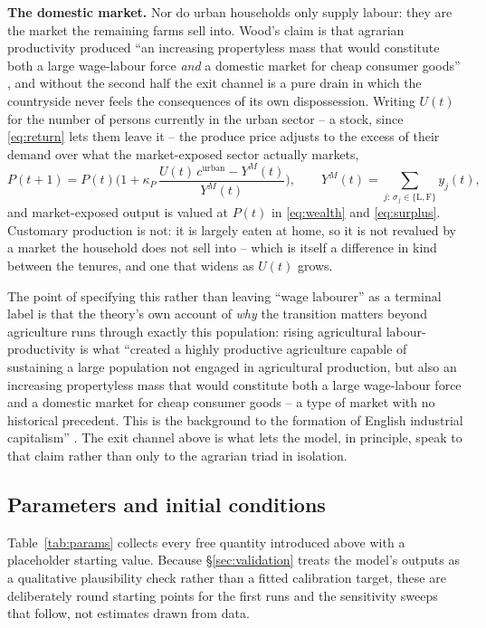 \documentclass[11pt,english]{article}
\begin{document}
\textbf{The domestic market.} Nor do urban households only supply labour: they are the market the remaining farms sell into. Wood's claim is that agrarian productivity produced ``an increasing propertyless mass that would constitute both a large wage-labour force \emph{and} a domestic market for cheap consumer goods'' \cite[p.103]{wood2002origin}, and without the second half the exit channel is a pure drain in which the countryside never feels the consequences of its own dispossession. Writing $U(t)$ for the number of persons currently in the urban sector -- a stock, since \eqref{eq:return} lets them leave it -- the produce price adjusts to the excess of their demand over what the market-exposed sector actually markets,
\begin{equation}
P(t+1) = P(t)\Big(1 + \kappa_{P}\,\frac{U(t)\,c^{\text{urban}} - Y^{M}(t)}{Y^{M}(t)}\Big), \qquad Y^{M}(t) = \sum_{j:\,\sigma_j\in\{\text{L},\text{F}\}} y_j(t),
\end{equation}
and market-exposed output is valued at $P(t)$ in \eqref{eq:wealth} and \eqref{eq:surplus}. Customary production is not: it is largely eaten at home, so it is not revalued by a market the household does not sell into -- which is itself a difference in kind between the tenures, and one that widens as $U(t)$ grows.

The point of specifying this rather than leaving ``wage labourer'' as a terminal label is that the theory's own account of \emph{why} the transition matters beyond agriculture runs through exactly this population: rising agricultural labour-productivity is what ``created a highly productive agriculture capable of sustaining a large population not engaged in agricultural production, but also an increasing propertyless mass that would constitute both a large wage-labour force and a domestic market for cheap consumer goods -- a type of market with no historical precedent. This is the background to the formation of English industrial capitalism'' \cite[p.103]{wood2002origin}. The exit channel above is what lets the model, in principle, speak to that claim rather than only to the agrarian triad in isolation.



\subsection{Parameters and initial conditions}
\label{sec:params}

Table~\ref{tab:params} collects every free quantity introduced above with a placeholder starting value. Because \S\ref{sec:validation} treats the model's outputs as a qualitative plausibility check rather than a fitted calibration target, these are deliberately round starting points for the first runs and the sensitivity sweeps that follow, not estimates drawn from data.
\end{document}
